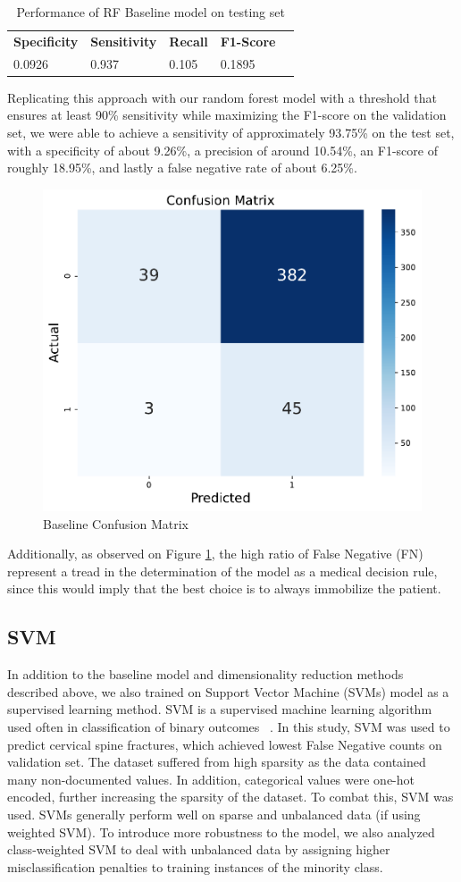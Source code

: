 \documentclass[10pt,letterpaper]{article}
\begin{document}
\begin{table}[H]
\centering
\footnotesize
\begin{tabular}{lllll}
\toprule
\textbf{Specificity} & \textbf{Sensitivity} & \textbf{Recall} &  \textbf{F1-Score}\\
0.0926 & 0.937  & 0.105 & 0.1895  \\
\bottomrule
\end{tabular}
\caption{Performance of RF Baseline model on testing set}%
\label{tab:svm_results}
\end{table}

Replicating this approach with our random forest model with a threshold that ensures at least 90\% sensitivity while maximizing the F1-score on the validation set, we were able to achieve a sensitivity of approximately 93.75\% on the test set, with a specificity of about 9.26\%, a precision of around 10.54\%, an F1-score of roughly 18.95\%, and lastly a false negative rate of about 6.25\%.

\begin{figure}[H]
    \centering
    \includegraphics[width=0.5\linewidth]{plots/confusion_matrix_baseline.pdf}
    \caption{Baseline Confusion Matrix}
    \label{fig:confusion-baseline}
\end{figure}

Additionally, as observed on Figure \ref{fig:confusion-baseline}, the high ratio of False Negative (FN) represent a tread in the determination of the model as a medical decision rule, since this would imply that the best choice is to always immobilize the patient. 

\subsection{SVM}
In addition to the baseline model and dimensionality reduction methods described above, we also trained on Support Vector Machine (SVMs) model as a supervised learning method. SVM is a supervised machine learning algorithm used often in classification of binary outcomes ~\cite{svm}. In this study, SVM was used to predict cervical spine fractures, which achieved lowest False Negative counts on validation set. The dataset suffered from high sparsity as the data contained many non-documented values. In addition, categorical values were one-hot encoded, further increasing the sparsity of the dataset. To combat this, SVM was used. SVMs generally perform well on sparse and unbalanced data (if using weighted SVM). To introduce more robustness to the model, we also analyzed class-weighted SVM to deal with unbalanced data by assigning higher misclassification penalties to training instances of the minority class.
\end{document}
